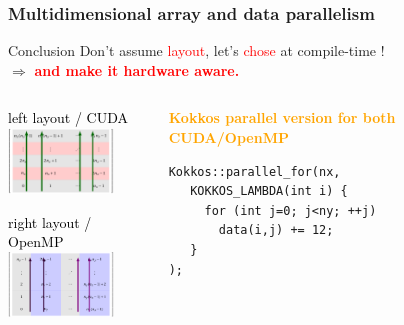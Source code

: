 \begin{frame}[fragile=singleslide]
  \frametitle{Multidimensional array and data parallelism}

  \begin{block}{Conclusion}
    {\Large Don't assume \textcolor{red}{layout}, let's \textcolor{red}{chose} at compile-time !\\
    $\Rightarrow$ \textcolor{red}{\textbf{and make it hardware aware.}}}
  \end{block}
  
  \begin{columns}
    \begin{column}{0.45\textwidth}
      \begin{center}
        \textcolor{black}{\large left layout / CUDA}\\
        \includegraphics[width=2.8cm]{images/tikz/row-major-cuda}

        \textcolor{black}{\large right layout / OpenMP}\\
        \includegraphics[width=2.8cm]{images/tikz/col-major-kokkos-openmp}

      \end{center}
    \end{column}
    \begin{column}{0.45\textwidth}
      \begin{center}
        \textcolor{orange}{\bf Kokkos parallel version for both CUDA/OpenMP}
      \end{center}
      \begin{verbatim}
Kokkos::parallel_for(nx,
   KOKKOS_LAMBDA(int i) {
     for (int j=0; j<ny; ++j)
       data(i,j) += 12;
   }
);
      \end{verbatim}
    \end{column}
    \hfill
  \end{columns}
\end{frame}
